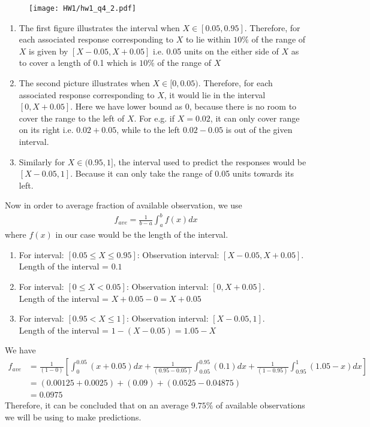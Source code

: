 \documentclass{article}[a4paper]
\begin{document}
\begin{figure}[H]
    \centering
    \texttt{[image: HW1/hw1\_q4\_2.pdf]}
\end{figure}
\begin{enumerate}
    \item The first figure illustrates the interval when $X \in [0.05, 0.95]$. Therefore, for each associated response corresponding to $X$ to lie within $10\%$ of the range of $X$ is given by $[X-0.05, X+0.05]$ i.e. 0.05 units on the either side of $X$ as to cover a length of 0.1 which is $10\%$ of the range of $X$
    \item The second picture illustrates when $X \in [0, 0.05)$. Therefore, for each associated response corresponding to $X$, it would lie in the interval $[0, X+0.05]$. Here we have lower bound as $0$, because there is no room to cover the range to the left of $X$. For e.g. if $X=0.02$, it can only cover range on its right i.e. $0.02+0.05$, while to the left $0.02-0.05$ is out of the given interval.
    \item Similarly for $X \in (0.95, 1]$, the interval used to predict the responses would be $[X-0.05, 1]$. Because it can only take the range of 0.05 units towards its left.
\end{enumerate}
 Now in order to average fraction of available observation, we use 
 \begin{align*}
     f_{ave} = \frac{1}{b-a} \int_{a}^{b} f(x) dx
 \end{align*}
where $f(x)$ in our case would be the length of the interval.
\begin{enumerate}
    \item For interval: $[0.05 \leq X \leq 0.95]$:  Observation interval: $[X-0.05, X+0.05]$.\\ Length of the interval = $0.1$
    \item For interval: $[0 \leq X < 0.05]$: Observation interval: $[0, X+0.05]$.\\ Length of the interval = $X+0.05 - 0 = X+0.05$
    \item For interval: $[0.95 < X \leq 1]$: Observation interval: $[X-0.05, 1]$.\\ Length of the interval = $1 - (X-0.05) = 1.05-X$
\end{enumerate}
We have
\begin{align*}
    f_{ave} &= \frac{1}{(1-0)} \left[ \int_{0}^{0.05} (x+0.05) dx + \frac{1}{(0.95-0.05)} \int_{0.05}^{0.95} (0.1) dx + \frac{1}{(1-0.95)} \int_{0.95}^{1} (1.05-x) dx \right]\\
    &= (0.00125+0.0025) + (0.09) + (0.0525-0.04875)\\
    &= 0.0975
\end{align*}
Therefore, it can be concluded that on an average $9.75\%$ of available observations we will be using to make predictions.
\end{document}
